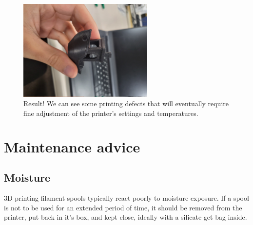 \documentclass[a4paper,11pt]{article}
\begin{document}
\begin{figure}[H]
    \centering 
    \includegraphics[width=0.6\textwidth]{img/ender/10.jpg} 
    \caption{Result! We can see some printing defects that will eventually require fine adjustment of the printer's settings and temperatures.}
    \label{fig:ender10}
\end{figure}




\pagebreak
\section{Maintenance advice}
\label{sec:org4b6b33d}

\subsection{Moisture}
\label{sec:org8102bbe}
3D printing filament spools typically react poorly to moisture exposure.
If a spool is not to be used for an extended period of time, it should be removed from the printer,
put back in it's box, and kept close, ideally with a silicate get bag inside.
\end{document}
